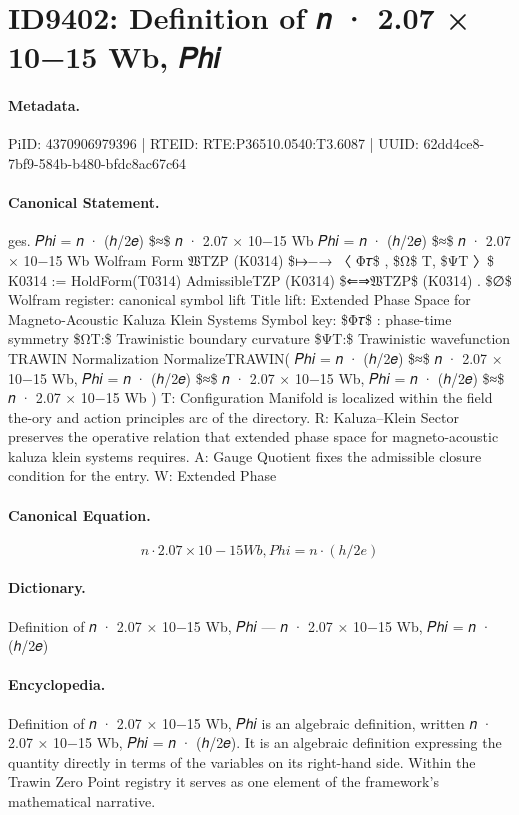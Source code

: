 \section*{ID9402: Definition of 𝑛 · 2.07 × 10−15 Wb, 𝑃ℎ𝑖}
\paragraph{Metadata.}
PiID: 4370906979396 | RTEID: RTE:P36510.0540:T3.6087 | UUID: 62dd4ce8-7bf9-584b-b480-bfdc8ac67c64

\paragraph{Canonical Statement.}
ges. 𝑃ℎ𝑖 = 𝑛 · (ℎ/2𝑒) \$≈\$ 𝑛 · 2.07 × 10−15 Wb 𝑃ℎ𝑖 = 𝑛 · (ℎ/2𝑒) \$≈\$ 𝑛 · 2.07 × 10−15 Wb Wolfram Form 𝔚TZP (K0314) \$↦−→ 〈 Φ𝜏\$ , \$Ω\$ T, \$ΨT 〉\$ K0314 := HoldForm(T0314) AdmissibleTZP (K0314) \$⇐⇒𝔚TZP\$ (K0314) . \$∅\$ Wolfram register: canonical symbol lift Title lift: Extended Phase Space for Magneto-Acoustic Kaluza Klein Systems Symbol key: \$Φ𝜏\$ : phase-time symmetry \$ΩT:\$ Trawinistic boundary curvature \$ΨT:\$ Trawinistic wavefunction TRAWIN Normalization NormalizeTRAWIN( 𝑃ℎ𝑖 = 𝑛 · (ℎ/2𝑒) \$≈\$ 𝑛 · 2.07 × 10−15 Wb, 𝑃ℎ𝑖 = 𝑛 · (ℎ/2𝑒) \$≈\$ 𝑛 · 2.07 × 10−15 Wb, 𝑃ℎ𝑖 = 𝑛 · (ℎ/2𝑒) \$≈\$ 𝑛 · 2.07 × 10−15 Wb ) T: Configuration Manifold is localized within the field the-ory and action principles arc of the directory. R: Kaluza–Klein Sector preserves the operative relation that extended phase space for magneto-acoustic kaluza klein systems requires. A: Gauge Quotient fixes the admissible closure condition for the entry. W: Extended Phase

\paragraph{Canonical Equation.}
\[
𝑛 · 2.07 × 10−15 Wb, 𝑃ℎ𝑖 = 𝑛 · (ℎ/2𝑒)
\]

\paragraph{Dictionary.}
Definition of 𝑛 · 2.07 × 10−15 Wb, 𝑃ℎ𝑖 — 𝑛 · 2.07 × 10−15 Wb, 𝑃ℎ𝑖 = 𝑛 · (ℎ/2𝑒)

\paragraph{Encyclopedia.}
Definition of 𝑛 · 2.07 × 10−15 Wb, 𝑃ℎ𝑖 is an algebraic definition, written 𝑛 · 2.07 × 10−15 Wb, 𝑃ℎ𝑖 = 𝑛 · (ℎ/2𝑒). It is an algebraic definition expressing the quantity directly in terms of the variables on its right-hand side. Within the Trawin Zero Point registry it serves as one element of the framework's mathematical narrative.
